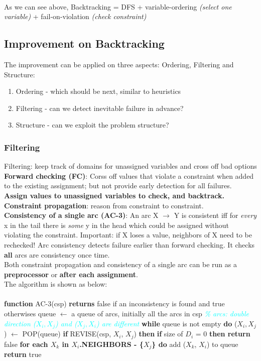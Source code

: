 \noindent
\\ As we can see above, Backtracking = DFS + variable-ordering \emph{(select one variable)} + fail-on-violation \emph{(check constraint)}

\subsection{Improvement on Backtracking}
The improvement can be applied on three aspects: Ordering, Filtering and Structure:
\begin{enumerate}
    \item Ordering - which should be next, similar to heuristics
    \item Filtering - can we detect inevitable failure in advance?
    \item Structure - can we exploit the problem structure?
\end{enumerate}

\subsubsection{Filtering}
\noindent
Filtering: keep track of domains for unassigned variables and cross off bad options \\
\textbf{Forward checking (FC)}: Corss off values that violate a constraint when added to the existing assignment; but not provide early detection for all failures. \textbf{Assign values to unassigned variables to check, and backtrack.} \textbf{Constraint propagation}: reason from constraint to constraint. \\
\textbf{Consistency of a single arc (AC-3)}: An arc X $\rightarrow$ Y is consistent iff for \emph{every} x in the tail there is \emph{some} y in the head which could be assigned without violating the constraint. Important: if X loses a value, neighbors of X need to be rechecked! Arc consistency detects failure earlier than forward checking. It checks \textbf{all} arcs are consistency once time. \\
Both constraint propagation and consistency of a single arc can be run as a \textbf{preprocessor} or \textbf{after each assignment}. \\
The algorithm is shown as below: \\ \\
\tabto{0mm} \textbf{function} AC-3(csp) \textbf{returns} false if an inconsistency is found and true otherwises
\tabto{5mm} queue $\leftarrow$ a queue of arcs, initially all the arcs in csp \textcolor{cyan}{\emph{\% arcs: double direction ($X_{i},X_{j}$) and ($X_{j},X_{i}$) are different}}
\tabto{5mm} \textbf{while} queue is not empty \textbf{do}
\tabto{10mm} ($X_{i},X_{j}$) $\leftarrow$ POP(queue)
\tabto{10mm} \textbf{if} REVISE(csp, $X_{i}$, $X_{j}$) \textbf{then}
\tabto{15mm} \textbf{if} size of $D_{i}$ = 0 \textbf{then return} false
\tabto{15mm} \textbf{for each $X_{k}$ in $X_{i}$.NEIGHBORS - \{$X_{j}$\} do}
\tabto{20mm} add ($X_{k}$, $X_{i}$) to queue
\tabto{5mm} \textbf{return} true

